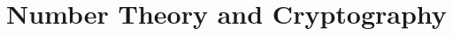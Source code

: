\documentclass[../discrete.tex]{subfiles}
\begin{document}
\chapter{Number Theory and Cryptography}
\end{document}
